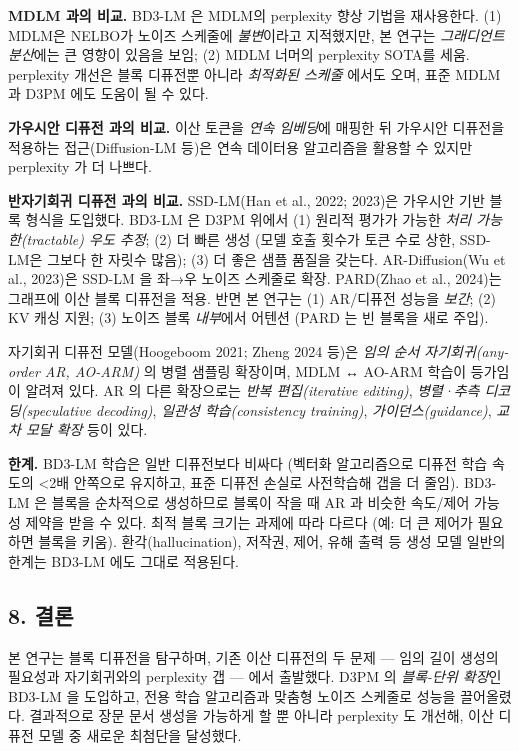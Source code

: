 \documentclass[
]{article}
\begin{document}
\textbf{MDLM 과의 비교.} BD3-LM 은 MDLM의 perplexity 향상 기법을
재사용한다. (1) MDLM은 NELBO가 노이즈 스케줄에 \emph{불변}이라고
지적했지만, 본 연구는 \emph{그래디언트 분산}에는 큰 영향이 있음을 보임;
(2) MDLM 너머의 perplexity SOTA를 세움. perplexity 개선은 블록 디퓨전뿐
아니라 \emph{최적화된 스케줄} 에서도 오며, 표준 MDLM과 D3PM 에도 도움이
될 수 있다.

\textbf{가우시안 디퓨전 과의 비교.} 이산 토큰을 \emph{연속 임베딩}에
매핑한 뒤 가우시안 디퓨전을 적용하는 접근(Diffusion-LM 등)은 연속
데이터용 알고리즘을 활용할 수 있지만 perplexity 가 더 나쁘다.

\textbf{반자기회귀 디퓨전 과의 비교.} SSD-LM(Han et al., 2022; 2023)은
가우시안 기반 블록 형식을 도입했다. BD3-LM 은 D3PM 위에서 (1) 원리적
평가가 가능한 \emph{처리 가능한(tractable) 우도 추정}; (2) 더 빠른 생성
(모델 호출 횟수가 토큰 수로 상한, SSD-LM은 그보다 한 자릿수 많음); (3)
더 좋은 샘플 품질을 갖는다. AR-Diffusion(Wu et al., 2023)은 SSD-LM 을
좌→우 노이즈 스케줄로 확장. PARD(Zhao et al., 2024)는 그래프에 이산 블록
디퓨전을 적용. 반면 본 연구는 (1) AR/디퓨전 성능을 \emph{보간}; (2) KV
캐싱 지원; (3) 노이즈 블록 \emph{내부}에서 어텐션 (PARD 는 빈 블록을
새로 주입).

자기회귀 디퓨전 모델(Hoogeboom 2021; Zheng 2024 등)은 \emph{임의 순서
자기회귀(any-order AR, AO-ARM)} 의 병렬 샘플링 확장이며, MDLM ↔ AO-ARM
학습이 등가임이 알려져 있다. AR 의 다른 확장으로는 \emph{반복
편집(iterative editing)}, \emph{병렬·추측 디코딩(speculative decoding)},
\emph{일관성 학습(consistency training)}, \emph{가이던스(guidance)},
\emph{교차 모달 확장} 등이 있다.

\textbf{한계.} BD3-LM 학습은 일반 디퓨전보다 비싸다 (벡터화 알고리즘으로
디퓨전 학습 속도의 \textless2배 안쪽으로 유지하고, 표준 디퓨전 손실로
사전학습해 갭을 더 줄임). BD3-LM 은 블록을 순차적으로 생성하므로 블록이
작을 때 AR 과 비슷한 속도/제어 가능성 제약을 받을 수 있다. 최적 블록
크기는 과제에 따라 다르다 (예: 더 큰 제어가 필요하면 블록을 키움).
환각(hallucination), 저작권, 제어, 유해 출력 등 생성 모델 일반의 한계는
BD3-LM 에도 그대로 적용된다.

\hypertarget{uxacb0uxb860}{%
\subsection{8. 결론}\label{uxacb0uxb860}}

본 연구는 블록 디퓨전을 탐구하며, 기존 이산 디퓨전의 두 문제 --- 임의
길이 생성의 필요성과 자기회귀와의 perplexity 갭 --- 에서 출발했다. D3PM
의 \emph{블록-단위 확장}인 BD3-LM 을 도입하고, 전용 학습 알고리즘과
맞춤형 노이즈 스케줄로 성능을 끌어올렸다. 결과적으로 장문 문서 생성을
가능하게 할 뿐 아니라 perplexity 도 개선해, 이산 디퓨전 모델 중 새로운
최첨단을 달성했다.
\end{document}
